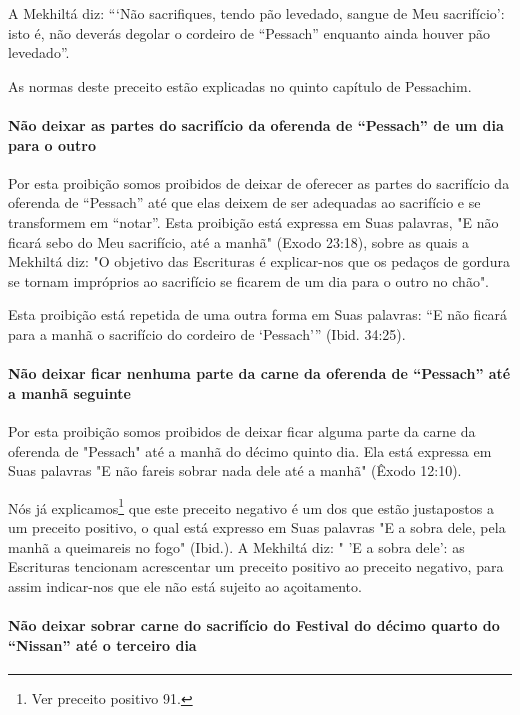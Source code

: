 A Mekhiltá diz: ```Não sacrifiques, tendo pão levedado, sangue de Meu
sacrifício': isto é, não deverás degolar o cordeiro de ``Pessach''
enquanto ainda houver pão levedado''.

As normas deste preceito estão explicadas no quinto capítulo de
Pessachim.

\paragraph{Não deixar as partes do sacrifício da oferenda de ``Pessach'' de um dia
para o outro}

Por esta proibição somos proibidos de deixar de oferecer as partes do
sacrifício da oferenda de ``Pessach'' até que elas deixem de ser
adequadas ao sacrifício e se transformem em ``notar''. Esta proibição
está expressa em Suas palavras, "E não ficará sebo do Meu sacrifício,
até a manhã" (Exodo 23:18), sobre as quais a Mekhiltá diz: "O objetivo
das Escrituras é explicar-nos que os pedaços de gordura se tornam
impróprios ao sacrifício se ficarem de um dia para o outro no chão".

Esta proibição está repetida de uma outra forma em Suas palavras: ``E
não ficará para a manhã o sacrifício do cordeiro de `Pessach''' (Ibid.
34:25).

\paragraph{Não deixar ficar nenhuma parte da carne da oferenda
de ``Pessach'' até a manhã seguinte}

Por esta proibição somos proibidos de deixar ficar alguma parte da carne
da oferenda de "Pessach" até a manhã do décimo quinto dia. Ela está
expressa em Suas palavras "E não fareis sobrar nada dele até a manhã"
(Êxodo 12:10).

Nós já explicamos\footnote{Ver preceito positivo 91.} que este preceito negativo é um
dos que estão justapostos a um preceito positivo, o qual está expresso
em Suas palavras "E a sobra dele, pela manhã a queimareis no fogo"
(Ibid.). A Mekhiltá diz: " 'E a sobra dele': as Escrituras tencionam
acrescentar um preceito positivo ao preceito negativo, para assim
indicar-nos que ele não está sujeito ao açoitamento.

\paragraph{Não deixar sobrar carne do sacrifício do Festival do décimo quarto
do ``Nissan'' até o terceiro dia}

